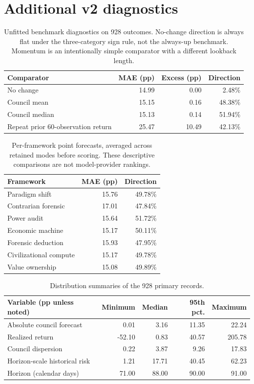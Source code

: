 \section{Additional v2 diagnostics}\label{app:diagnostics}
\begin{table}[H]
\centering\small
\begin{tabular}{lrrr}
\toprule
Comparator & MAE (pp) & Excess (pp) & Direction\\
\midrule
No change & 14.99 & 0.00 & 2.48\%\\
Council mean & 15.15 & 0.16 & 48.38\%\\
Council median & 15.13 & 0.14 & 51.94\%\\
Repeat prior 60-observation return & 25.47 & 10.49 & 42.13\%\\
\bottomrule
\end{tabular}
\caption{Unfitted benchmark diagnostics on 928 outcomes. No-change direction is always flat under the three-category sign rule, not the always-up benchmark. Momentum is an intentionally simple comparator with a different lookback length.}
\end{table}
\begin{table}[H]
\centering\small
\begin{tabular}{lrr}
\toprule
Framework & MAE (pp) & Direction\\
\midrule
Paradigm shift & 15.76 & 49.78\%\\
Contrarian forensic & 17.01 & 47.84\%\\
Power audit & 15.64 & 51.72\%\\
Economic machine & 15.17 & 50.11\%\\
Forensic deduction & 15.93 & 47.95\%\\
Civilizational compute & 15.17 & 49.78\%\\
Value ownership & 15.08 & 49.89\%\\
\bottomrule
\end{tabular}
\caption{Per-framework point forecasts, averaged across retained modes before scoring. These descriptive comparisons are not model-provider rankings.}
\end{table}
\begin{table}[H]
\centering\small
\begin{tabular}{lrrrr}
\toprule
Variable (pp unless noted) & Minimum & Median & 95th pct. & Maximum\\
\midrule
Absolute council forecast & 0.01 & 3.16 & 11.35 & 22.24\\
Realized return & -52.10 & 0.83 & 40.57 & 205.78\\
Council dispersion & 0.22 & 3.87 & 9.26 & 17.83\\
Horizon-scale historical risk & 1.21 & 17.71 & 40.45 & 62.23\\
Horizon (calendar days) & 71.00 & 88.00 & 90.00 & 91.00\\
\bottomrule
\end{tabular}
\caption{Distribution summaries of the 928 primary records.}
\end{table}
